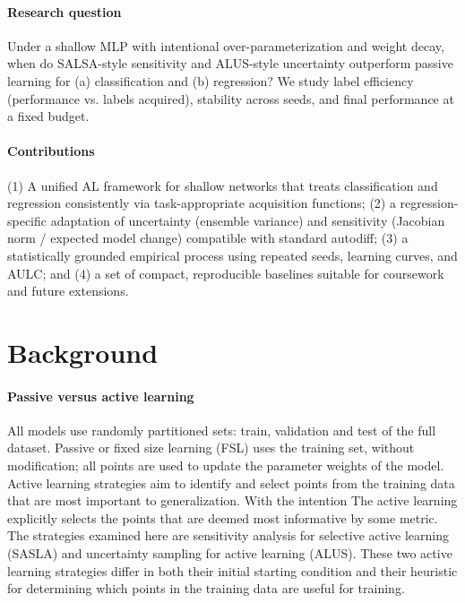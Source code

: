 \documentclass[conference]{IEEEtran}
\begin{document}
\paragraph*{Research question} Under a shallow MLP with intentional over-parameterization and weight decay, when do SALSA-style sensitivity and ALUS-style uncertainty outperform passive learning for (a) classification and (b) regression? We study label efficiency (performance vs. labels acquired), stability across seeds, and final performance at a fixed budget.

\paragraph*{Contributions}(1) A unified AL framework for shallow networks that treats classification and regression consistently via task-appropriate acquisition functions; (2) a regression-specific adaptation of uncertainty (ensemble variance) and sensitivity (Jacobian norm / expected model change) compatible with standard autodiff; (3) a statistically grounded empirical process using repeated seeds, learning curves, and AULC; and (4) a set of compact, reproducible baselines suitable for coursework and future extensions.

\section*{Background}

\paragraph*{Passive versus active learning}
All models use randomly partitioned sets: train, validation and test of the full dataset. Passive or fixed size learning (FSL) uses the training set, without modification; all points are used to update the parameter weights of the model. Active learning strategies aim to identify and select points from the training data that are most important to generalization. With the intention The active learning explicitly selects the points that are deemed most informative by some metric. The strategies examined here are sensitivity analysis for selective active learning (SASLA) and uncertainty sampling for active learning (ALUS). These two active learning strategies differ in both their initial starting condition and their heuristic for determining which points in the training data are useful for training.  
\end{document}
